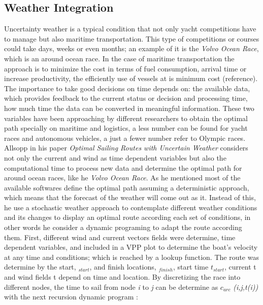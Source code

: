 \subsection{Weather Integration}
Uncertainty weather is a typical condition that not only yacht competitions  have to manage but also maritime transportation. This type of competitions or courses could take days, weeks or even months; an example of  it is the \textit{Volvo Ocean Race}, which is an around ocean race.  In the case of maritime transportation the approach is to minimize the cost in terms of  fuel consumption, arrival time or increase productivity, the efficiently use of vessels at is minimum cost  (reference). The importance to take good decisions on time depends on: the available data, which provides feedback to the current status or decision and processing time,  how much time the data can be converted in meaningful information. These two variables have been approaching by different researchers to obtain the optimal path specially on maritime and logistics, a less number can be found for yacht races and autonomous vehicles, a just a fewer number refer to Olympic races. \newline
Allsopp \cite{allsopp2000optimal} in his paper \textit{Optimal Sailing Routes with Uncertain Weather} considers not only  the current and wind as time dependent variables  but also the computational time to process new data and determine the optimal path for around ocean races, like he \textit{Volvo Ocean Race}.  As he mentioned most of the available softwares define the optimal path assuming a deterministic approach, which means that the forecast of the weather will come out as it.  Instead of this, he use a stochastic weather approach to contemplate  different weather conditions and its changes to display an optimal route according each set of conditions, in other words he consider a dynamic programing to adapt the route according them.  
First, different wind and current vectors fields were determine, time dependent variables, and included in a VPP plot to determine the boat's velocity at any time and conditions;  which is reached by a lookup function. 
The route was determine by the start, $_{start}$,  and finish locations, $_{finish}$,  start time $t_{start}$, current  t\bm{$)$} and wind fields  t \bm{$)$}  depend on time and location. By discretizing the race into different nodes, the time to sail from node \textit{i} to \textit{j} can be determine as $c_{arc}$ \textit{(i,j,t(i))} with the next recursion dynamic program \cite{allsopp2000optimal}:
